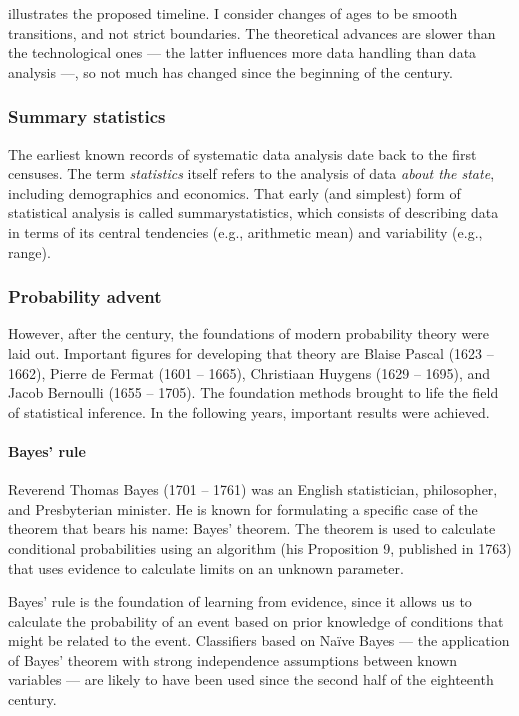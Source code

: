  illustrates the proposed timeline.  I consider changes of
ages to be smooth transitions, and not strict boundaries.  The theoretical advances are
slower than the technological ones --- the latter influences more data handling than data
analysis ---, so not much has changed since the beginning of the  century.

\subsubsection{Summary statistics}

The earliest known records of systematic data analysis date back to the first censuses.
The term \emph{statistics} itself refers to the analysis of data \emph{about the state},
including demographics and economics.  That early (and simplest) form of statistical
analysis is called \gls{summarystatistics}, which consists of describing data in terms
of its central tendencies (e.g., arithmetic mean) and variability (e.g., range).

\subsubsection{Probability advent}

However, after the  century, the foundations of modern probability theory were
laid out.  Important figures for developing that theory are Blaise Pascal (1623
-- 1662), Pierre de Fermat (1601 -- 1665), Christiaan Huygens (1629 -- 1695), and Jacob
Bernoulli (1655 -- 1705).
The foundation methods brought to life the field of statistical inference. In the
following years, important results were achieved.

\paragraph{Bayes' rule}

Reverend Thomas Bayes (1701 -- 1761) was an English statistician, philosopher, and
Presbyterian minister.  He is known for formulating a specific case of the theorem that
bears his name: Bayes' theorem.  The theorem is used to calculate conditional
probabilities using an algorithm (his Proposition 9, published in 1763) that uses evidence to calculate
limits on an unknown parameter.

Bayes' rule is the foundation of learning from evidence, since it allows us to
calculate the probability of an event based on prior knowledge of conditions that might be
related to the event.  Classifiers based on Naïve Bayes --- the application of Bayes'
theorem with strong independence assumptions between known variables --- are likely to have
been used since the second half of the eighteenth century.

